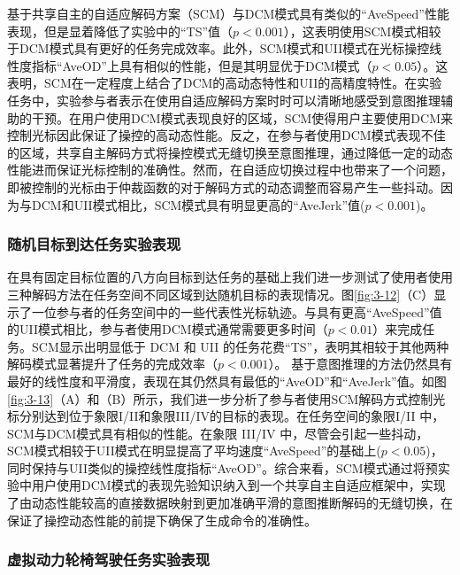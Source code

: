 基于共享自主的自适应解码方案（SCM）与DCM模式具有类似的``AveSpeed''性能表现，但是显着降低了实验中的``TS''值（$p<0.001$），这表明使用SCM模式相较于DCM模式具有更好的任务完成效率。此外，SCM模式和UII模式在光标操控线性度指标``AveOD''上具有相似的性能，但是其明显优于DCM模式（$p<0.05$）。这表明，SCM在一定程度上结合了DCM的高动态特性和UII的高精度特性。在实验任务中，实验参与者表示在使用自适应解码方案时时可以清晰地感受到意图推理辅助的干预。在用户使用DCM模式表现良好的区域，SCM使得用户主要使用DCM来控制光标因此保证了操控的高动态性能。反之，在参与者使用DCM模式表现不佳的区域，共享自主解码方式将操控模式无缝切换至意图推理，通过降低一定的动态性能进而保证光标控制的准确性。然而，在自适应切换过程中也带来了一个问题，即被控制的光标由于仲裁函数的对于解码方式的动态调整而容易产生一些抖动。因为与DCM和UII模式相比，SCM模式具有明显更高的``AveJerk''值($p<0.001$)。  

\subsubsection{随机目标到达任务实验表现}在具有固定目标位置的八方向目标到达任务的基础上我们进一步测试了使用者使用三种解码方法在任务空间不同区域到达随机目标的表现情况。图\ref{fig:3-12}（C）显示了一位参与者的任务空间中的一些代表性光标轨迹。与具有更高``AveSpeed''值的UII模式相比，参与者使用DCM模式通常需要更多时间（$p<0.01$）来完成任务。SCM显示出明显低于 DCM 和 UII 的任务花费``TS''，表明其相较于其他两种解码模式显著提升了任务的完成效率（$p<0.001$）。 基于意图推理的方法仍然具有最好的线性度和平滑度，表现在其仍然具有最低的``AveOD''和``AveJerk''值。如图\ref{fig:3-13}（A）和（B）所示，我们进一步分析了参与者使用SCM解码方式控制光标分别达到位于象限I/II和象限III/IV的目标的表现。在任务空间的象限I/II 中，SCM与DCM模式具有相似的性能。在象限 III/IV 中，尽管会引起一些抖动，SCM模式相较于UII模式在明显提高了平均速度``AveSpeed''的基础上($p<0.05$)，同时保持与UII类似的操控线性度指标``AveOD''。综合来看，SCM模式通过将预实验中用户使用DCM模式的表现先验知识纳入到一个共享自主自适应框架中，实现了由动态性能较高的直接数据映射到更加准确平滑的意图推断解码的无缝切换，在保证了操控动态性能的前提下确保了生成命令的准确性。  

\subsubsection{虚拟动力轮椅驾驶任务实验表现}     
  
